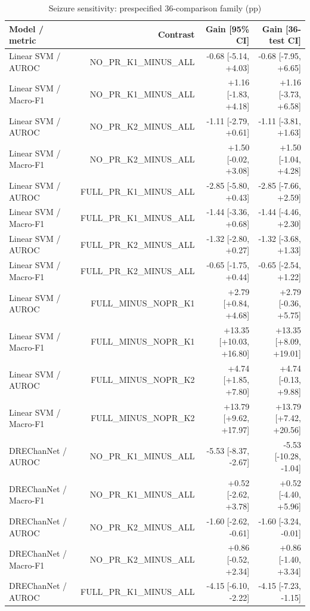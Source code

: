 \begin{table}[t]
\centering
\caption{Seizure sensitivity: prespecified 36-comparison family (pp)}
\small
\begin{tabular}{lrrr}
\toprule
Model / metric & Contrast & Gain [95\% CI] & Gain [36-test CI] \\
\midrule
Linear SVM / AUROC & NO\_PR\_K1\_MINUS\_ALL & -0.68 [-5.14, +4.03] & -0.68 [-7.95, +6.65] \\
Linear SVM / Macro-F1 & NO\_PR\_K1\_MINUS\_ALL & +1.16 [-1.83, +4.18] & +1.16 [-3.73, +6.58] \\
Linear SVM / AUROC & NO\_PR\_K2\_MINUS\_ALL & -1.11 [-2.79, +0.61] & -1.11 [-3.81, +1.63] \\
Linear SVM / Macro-F1 & NO\_PR\_K2\_MINUS\_ALL & +1.50 [-0.02, +3.08] & +1.50 [-1.04, +4.28] \\
Linear SVM / AUROC & FULL\_PR\_K1\_MINUS\_ALL & -2.85 [-5.80, +0.43] & -2.85 [-7.66, +2.59] \\
Linear SVM / Macro-F1 & FULL\_PR\_K1\_MINUS\_ALL & -1.44 [-3.36, +0.68] & -1.44 [-4.46, +2.30] \\
Linear SVM / AUROC & FULL\_PR\_K2\_MINUS\_ALL & -1.32 [-2.80, +0.27] & -1.32 [-3.68, +1.33] \\
Linear SVM / Macro-F1 & FULL\_PR\_K2\_MINUS\_ALL & -0.65 [-1.75, +0.44] & -0.65 [-2.54, +1.22] \\
Linear SVM / AUROC & FULL\_MINUS\_NOPR\_K1 & +2.79 [+0.84, +4.68] & +2.79 [-0.36, +5.75] \\
Linear SVM / Macro-F1 & FULL\_MINUS\_NOPR\_K1 & +13.35 [+10.03, +16.80] & +13.35 [+8.09, +19.01] \\
Linear SVM / AUROC & FULL\_MINUS\_NOPR\_K2 & +4.74 [+1.85, +7.80] & +4.74 [-0.13, +9.88] \\
Linear SVM / Macro-F1 & FULL\_MINUS\_NOPR\_K2 & +13.79 [+9.62, +17.97] & +13.79 [+7.42, +20.56] \\
DREChanNet / AUROC & NO\_PR\_K1\_MINUS\_ALL & -5.53 [-8.37, -2.67] & -5.53 [-10.28, -1.04] \\
DREChanNet / Macro-F1 & NO\_PR\_K1\_MINUS\_ALL & +0.52 [-2.62, +3.78] & +0.52 [-4.40, +5.96] \\
DREChanNet / AUROC & NO\_PR\_K2\_MINUS\_ALL & -1.60 [-2.62, -0.61] & -1.60 [-3.24, -0.01] \\
DREChanNet / Macro-F1 & NO\_PR\_K2\_MINUS\_ALL & +0.86 [-0.52, +2.34] & +0.86 [-1.40, +3.34] \\
DREChanNet / AUROC & FULL\_PR\_K1\_MINUS\_ALL & -4.15 [-6.10, -2.22] & -4.15 [-7.23, -1.15] \\

\end{tabular}
\end{table}
